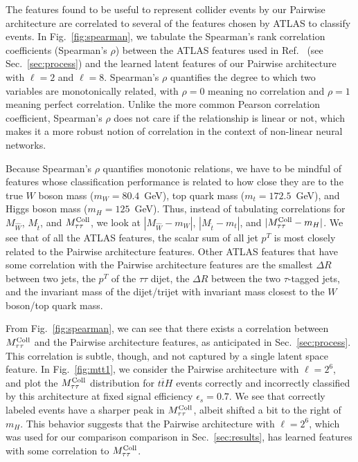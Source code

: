 \documentclass[aps,prd,twocolumn,superscriptaddress,floatfix,longbibliography,preprintnumbers,nofootinbib]{revtex4-1} %
\DeclareRobustCommand{\Sec}[1]{Sec.~\ref{sec:#1}}
\DeclareRobustCommand{\Fig}[1]{Fig.~\ref{fig:#1}}
\DeclareRobustCommand{\RRef}[1]{Ref.~\cite{#1}}
\begin{document}
The features found to be useful to represent collider events by our Pairwise architecture are correlated to several of the features chosen by ATLAS to classify events.
%
In \Fig{spearman}, we tabulate the Spearman's rank correlation coefficients (Spearman's $\rho$) between the ATLAS features used in \RRef{ATLAS:2022yrq} (see \Sec{process}) and the learned latent features of our Pairwise architecture with $\ell=2$ and $\ell=8$. 
%
Spearman's $\rho$ quantifies the degree to which two variables are monotonically related, with $\rho = 0$ meaning no correlation and $\rho =1$ meaning perfect correlation.
%
Unlike the more common Pearson correlation coefficient, Spearman's $\rho$ does not care if the relationship is linear or not, which makes it a more robust notion of correlation in the context of non-linear neural networks. 


Because Spearman's $\rho$ quantifies monotonic relations, we have to be mindful of features whose classification performance is related to how close they are to the true $W$ boson mass ($m_W = 80.4$~GeV), top quark mass ($m_t = 172.5$~GeV), and Higgs boson mass ($m_H = 125$~GeV).
%
Thus, instead of tabulating correlations for $M_{\hat{W}}$, $M_{\hat{t}}$, and $M^{\rm Coll}_{\tau \tau}$, we look at $|M_{\hat{W}} - m_W|$, $|M_{\hat{t}}-m_t|$, and $|M^{\rm Coll}_{\tau\tau}-m_H|$.
%
We see that of all the ATLAS features, the scalar sum of all jet \(p^T\) is most closely related to the Pairwise architecture features.
%
Other ATLAS features that have some correlation with the Pairwise architecture features are the smallest $\Delta R$ between two jets, the $p^T$ of the \(\tau\tau\) dijet, the $\Delta R$ between the two \(\tau\)-tagged jets, and the invariant mass of the dijet/trijet with invariant mass closest to the $W$ boson/top quark mass. 


From \Fig{spearman}, we can see that there exists a correlation between $M^{\rm Coll}_{\tau\tau}$ and the Pairwise architecture features, as anticipated in \Sec{process}. 
%
This correlation is subtle, though, and not captured by a single latent space feature.
%
In \Fig{mtt1}, we consider the Pairwise architecture with \(\ell=2^6\), and plot the $M^{\rm Coll}_{\tau\tau}$ distribution for \(t\overline{t}H\) events correctly and incorrectly classified by this architecture at fixed signal efficiency \(\epsilon_s=0.7\).
%
We see that correctly labeled events have a sharper peak in $M^{\rm Coll}_{\tau\tau}$, albeit shifted a bit to the right of $m_H$.
%
This behavior suggests that the Pairwise architecture with \(\ell=2^6\), which was used for our comparison comparison in \Sec{results}, has learned features with some correlation to $M^{\rm Coll}_{\tau\tau}$.
\end{document}
